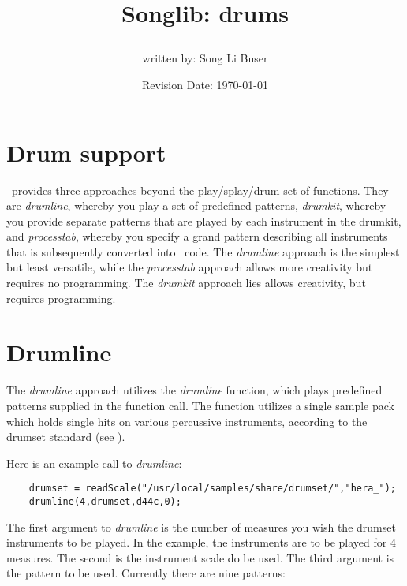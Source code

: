 \documentclass{article}
\title{Songlib: drums\\
\date{Revision Date: \today}}
\author{written by: Song Li Buser}
\begin{document}
\maketitle

\W\subsubsection*{}
\W\htmlrule

\section*{Drum support}

\Songlib\ provides three approaches beyond the play/splay/drum set of
functions. They are {\it drumline}, whereby you play a set of predefined
patterns, {\it drumkit}, whereby you provide separate patterns that are
played by each instrument in the drumkit, and {\it processtab}, whereby
you specify a grand pattern describing all instruments that is
subsequently converted into \songlib\ code.
The {\it drumline} approach is the simplest but least versatile,
while the {\it processtab} approach allows more creativity
but requires no programming.
The {\it drumkit} approach lies allows creativity, but requires
programming.

\section*{Drumline}

The {\it drumline} approach utilizes the
{\it drumline} function, which plays predefined patterns supplied in
the function call.
The function utilizes a single sample pack which holds single hits on 
various percussive instruments, according to the drumset standard
(see ).

Here is an example
call to {\it drumline}:

\begin{verbatim}
    drumset = readScale("/usr/local/samples/share/drumset/","hera_");
    drumline(4,drumset,d44c,0);
\end{verbatim}

The first argument to {\it drumline} is the number of measures you wish the
drumset instruments to be played.
In the example, the instruments are to be played for 4
measures. The second is the instrument scale do be used.
The third argument is the pattern
to be used. Currently there are nine patterns:
\end{document}

